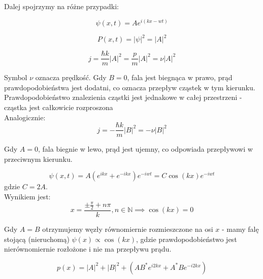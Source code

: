 Dalej spojrzymy na różne przypadki: \\


\begin{equation*}
    \psi(x, t) = A e^{i(kx - wt)}
\end{equation*}

\begin{equation*}
    P(x, t) = \left| \psi \right|^2 = \left| A \right|^2
\end{equation*}

\begin{equation*}
    j = \frac{\hbar k}{m} \left| A \right|^2 = \frac{p}{m} \left| A \right|^2 = \nu \left| A \right|^2
\end{equation*}

Symbol $\nu$ oznacza prędkość. Gdy $B=0$, fala jest biegnąca w prawo, prąd prawdopodobieństwa jest dodatni, co oznacza przepływ
cząstek w tym kierunku. Prawdopodobieństwo znalezienia cząstki jest jednakowe w całej przestrzeni - cząstka jest całkowicie rozproszona \\

Analogicznie:
\begin{equation*}
    j = - \frac{\hbar k}{m} \left| B \right|^2 = - \nu \left| B \right|^2
\end{equation*}

Gdy $A=0$, fala biegnie w lewo, prąd jest ujemny, co odpowiada przepływowi w przeciwnym kierunku. \\


\begin{equation*}
    \psi(x, t) = A \left( e^{ikx} + e^{-ikx} \right) e^{-i w t} = C \cos(kx) e^{-i w t}
\end{equation*}
gdzie $C = 2A$. \\
Wynikiem jest:
\begin{equation*}
    x = \frac{\pm \frac{\pi}{2} + n \pi}{k}, n \in \mathbb{N} \implies \cos(kx) = 0
\end{equation*}

Gdy $A=B$ otrzymujemy węzły równomiernie rozmieszczone na osi $x$ - mamy falę stojącą (nieruchomą)
$\psi(x) \propto \cos(kx)$, gdzie prawdopodobieństwo jest nierównomiernie rozłożone i nie ma przepływu prądu. \\


\begin{equation*}
    p(x) = \left| A \right|^2 + \left| B \right|^2 + \left( A B^* e^{i 2kx} + A^* B e^{-i 2kx} \right)
\end{equation*}

